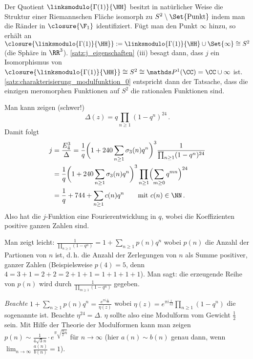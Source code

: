\begin{beme-list}
	\item Der Quotient $\linksmodulo{\Gamma(1)}{\HH}$ besitzt in natürlicher Weise die Struktur einer Riemannschen Fläche isomorph zu $S^2 \setminus\Set{\text{Punkt}}$ indem man die Ränder in $\closure{\F_1}$ identifiziert.
	Fügt man den Punkt $\infty$ hinzu, so erhält an $\closure{\linksmodulo{\Gamma(1)}{\HH}} := \linksmodulo{\Gamma(1)}{\HH} \cup \Set{\infty} \cong S^2$ (die Sphäre in $\RR^3$).
	\autoref{satz:j_eigenschaften} (iii) besagt dann, dass $j$ ein Isomorphismus von $\closure{\linksmodulo{\Gamma(1)}{\HH}} \cong S^2 \cong \mathds P^1(\CC) = \CC \cup \infty$ ist.
	\autoref{satz:charakterisierung_modulfunktion_0} entspricht dann der Tatsache, dass die einzigen meromorphen Funktionen auf $S^2$ die rationalen Funktionen sind.
	
	\item Man kann zeigen (schwer!)
	\[
		\Delta(z) = q \prod_{n\geq1} (1-q^n)^{24}
		\,.
	\]
	Damit folgt
	\begin{align*}
		j
		&= \frac{E_4^3}{\Delta}
		= \frac{1}{q} \biggl(1 + 240\sum_{n\geq1} \sigma_3(n)q^n\biggr)^3 \frac{1}{\prod_{n\geq1} (1 - q^n)^{24}} \\
		&= \frac{1}{q} \biggl(1 + 240\sum_{n\geq1} \sigma_3(n)q^n\biggr)^3 \prod_{n\geq1} \Bigl(\sum_{m\geq0} q^{mn}\Bigr)^{24} \\
		&= \frac{1}{q} + 744 + \sum_{n \geq 1} c(n)q^n \qquad \text{mit } c(n) \in \NN
		\,.
	\end{align*}
	Also hat die $j$-Funktion eine Fourierentwicklung in $q$, wobei die Koeffizienten positive ganzen Zahlen sind.
	
	\item Man zeigt leicht: $\frac{1}{\prod_{n\geq1} (1-q^n)} = 1 + \sum_{n\geq1} p(n)q^n$ wobei $p(n)$ die Anzahl der Partionen von $n$ ist, d.\,h. die Anzahl der Zerlegungen von $n$ als Summe positiver, ganzer Zahlen (Beispielsweise $p(4) = 5$, denn $4 = 3 + 1 = 2 + 2 = 2 + 1 + 1 = 1 + 1 + 1 + 1$).
	Man sagt: die erzeugende Reihe von $p(n)$ wird durch $\frac{1}{\prod_{m\geq1} (1-q^n)}$ gegeben.
	
	\emph{Beachte} $1 + \sum_{n\geq1} p(n)q^n = \frac{e^{\pi i\frac{z}{12}}}{\eta(z)}$ wobei $\eta(z) = e^{\pi i\frac{z}{12}} \prod_{n\geq1} (1-q^n)$ die sogenannte  ist.
	Beachte $\eta^{24} = \Delta$.
	$\eta$ sollte also eine Modulform vom Gewicht $\frac{1}{2}$ sein.
	Mit Hilfe der Theorie der Modulformen kann man zeigen $p(n) \sim \frac{1}{4\sqrt 3 n} \cdot e^{\pi \sqrt{\frac{3}{2}n}}$ für $n\to\infty$ (hier $a(n) \sim b(n)$ genau dann, wenn $\lim_{n\to\infty} \frac{a(n)}{b(n)} = 1$).
\end{beme-list}